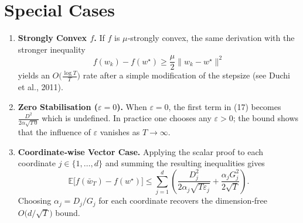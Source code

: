 \documentclass{article}
\begin{document}
\section*{Special Cases}
\begin{enumerate}[label=(S\arabic*)]
\item \textbf{Strongly Convex $f$.}
If $f$ is $\mu$‑strongly convex, the same derivation with the stronger
inequality
\[
f(w_{k})-f(w^{\star})\ge \frac{\mu}{2}\|w_{k}-w^{\star}\|^{2}
\]
yields an $O\!\bigl(\frac{\log T}{T}\bigr)$ rate after a simple
modification of the stepsize (see Duchi et al., 2011).
\item \textbf{Zero Stabilisation ($\varepsilon=0$).}
When $\varepsilon=0$, the first term in (17) becomes
$\frac{D^{2}}{2\alpha\sqrt{T\,0}}$ which is undefined. In practice one
chooses any $\varepsilon>0$; the bound shows that the influence of
$\varepsilon$ vanishes as $T\to\infty$.
\item \textbf{Coordinate‑wise Vector Case.}
Applying the scalar proof to each coordinate $j\in\{1,\dots,d\}$ and
summing the resulting inequalities gives
\[
\mathbb{E}\!\bigl[f(\bar w_{T})-f(w^{\star})\bigr]
\le
\sum_{j=1}^{d}
\left(
\frac{D_{j}^{2}}{2\alpha_{j}\sqrt{T\varepsilon_{j}}}
+\frac{\alpha_{j}G_{j}^{2}}{2\sqrt{T}}
\right).
\]
Choosing $\alpha_{j}=D_{j}/G_{j}$ for each coordinate recovers the
dimension‑free $O\!\bigl(d/\sqrt{T}\bigr)$ bound.
\end{enumerate}

\end{document}
